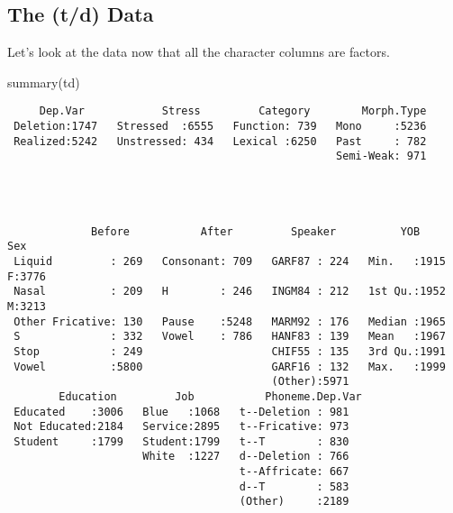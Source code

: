 \documentclass[
  10pt,
  letterpaper]{article}
\newenvironment{Shaded}{\begin{snugshade}}{\end{snugshade}}
\newcommand{\FunctionTok}[1]{\textcolor[rgb]{0.28,0.35,0.67}{#1}}
\newcommand{\NormalTok}[1]{\textcolor[rgb]{0.00,0.23,0.31}{#1}}
\begin{document}
\hypertarget{the-td-data}{%
\subsection{The (t/d) Data}\label{the-td-data}}

Let's look at the data now that all the character columns are factors.

\begin{Shaded}
\begin{Highlighting}[]
\FunctionTok{summary}\NormalTok{(td)}
\end{Highlighting}
\end{Shaded}

\begin{verbatim}
     Dep.Var            Stress         Category        Morph.Type  
 Deletion:1747   Stressed  :6555   Function: 739   Mono     :5236  
 Realized:5242   Unstressed: 434   Lexical :6250   Past     : 782  
                                                   Semi-Weak: 971  
                                                                   
                                                                   
                                                                   
                                                                   
             Before           After         Speaker          YOB       Sex     
 Liquid         : 269   Consonant: 709   GARF87 : 224   Min.   :1915   F:3776  
 Nasal          : 209   H        : 246   INGM84 : 212   1st Qu.:1952   M:3213  
 Other Fricative: 130   Pause    :5248   MARM92 : 176   Median :1965           
 S              : 332   Vowel    : 786   HANF83 : 139   Mean   :1967           
 Stop           : 249                    CHIF55 : 135   3rd Qu.:1991           
 Vowel          :5800                    GARF16 : 132   Max.   :1999           
                                         (Other):5971                          
        Education         Job           Phoneme.Dep.Var
 Educated    :3006   Blue   :1068   t--Deletion : 981  
 Not Educated:2184   Service:2895   t--Fricative: 973  
 Student     :1799   Student:1799   t--T        : 830  
                     White  :1227   d--Deletion : 766  
                                    t--Affricate: 667  
                                    d--T        : 583  
                                    (Other)     :2189  
\end{verbatim}
\end{document}
